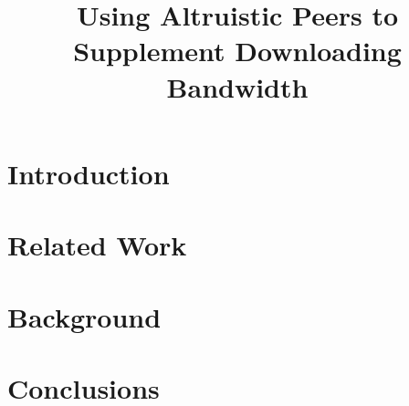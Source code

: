 \documentclass[conference]{IEEEtran}
\begin{document}
\title{Using Altruistic Peers to Supplement Downloading Bandwidth}
\author{
}

\maketitle

\begin{abstract}
\end{abstract}


\section{Introduction}
\label{intro}




\section{Related Work}
\label{related}




\section{Background}
\label{background}




\section{Conclusions}
\label{conclusions}





\end{document}

